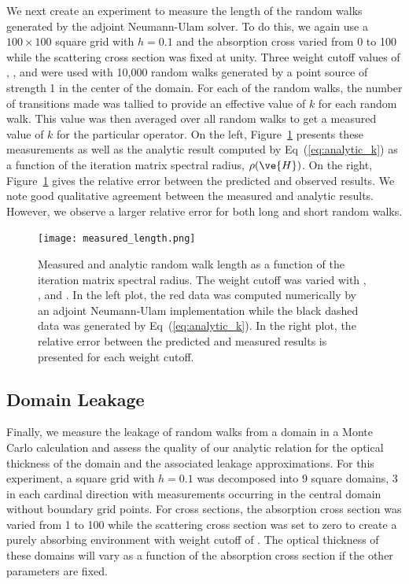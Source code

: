 \documentclass[preprint,11pt]{elsarticle}
\begin{document}
We next create an experiment to measure the length of the random walks
generated by the adjoint Neumann-Ulam solver. To do this, we again use a $100
\times 100$ square grid with $h=0.1$ and the absorption cross varied from 0 to
100 while the scattering cross section was fixed at unity. Three weight cutoff
values of , , and  were used with 10,000 random
walks generated by a point source of strength 1 in the center of the
domain. For each of the random walks, the number of transitions made was
tallied to provide an effective value of $k$ for each random walk. This value
was then averaged over all random walks to get a measured value of $k$ for the
particular operator. On the left, Figure~\ref{fig:measured_length} presents
these measurements as well as the analytic result computed by
Eq~(\ref{eq:analytic_k}) as a function of the iteration matrix spectral
radius, $\rho(\ve{H})$. On the right, Figure~\ref{fig:measured_length} gives
the relative error between the predicted and observed results. We note good
qualitative agreement between the measured and analytic results. However, we
observe a larger relative error for both long and short random walks.
\begin{figure}[ht!]
  \begin{center}
    \texttt{[image: measured\_length.png]}
  \end{center}
  \caption{Measured and analytic random walk length as a function of
    the iteration matrix spectral radius. The weight cutoff was
    varied with , , and . In the left
    plot, the red data was computed numerically by an adjoint
    Neumann-Ulam implementation while the black dashed data was
    generated by Eq~(\ref{eq:analytic_k}). In the right plot, the
    relative error between the predicted and measured results is
    presented for each weight cutoff.}
  \label{fig:measured_length}
\end{figure}

\subsection{Domain Leakage}
\label{subsec:domain_leakage}

Finally, we measure the leakage of random walks from a domain in a Monte Carlo
calculation and assess the quality of our analytic relation for the optical
thickness of the domain and the associated leakage approximations. For this
experiment, a square grid with $h=0.1$ was decomposed into 9 square domains, 3
in each cardinal direction with measurements occurring in the central domain
without boundary grid points. For cross sections, the absorption cross section
was varied from 1 to 100 while the scattering cross section was set to zero to
create a purely absorbing environment with weight cutoff of . The
optical thickness of these domains will vary as a function of the absorption
cross section if the other parameters are fixed.
\end{document}
